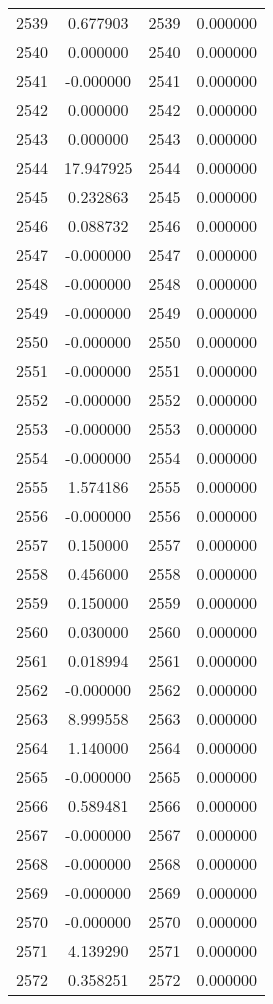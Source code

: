 \documentclass[12pt]{article}
\begin{document}
\begin{longtable}{@{}cccc@{}}
2539 & 0.677903 & 2539 & 0.000000 \\
2540 & 0.000000 & 2540 & 0.000000 \\
2541 & -0.000000 & 2541 & 0.000000 \\
2542 & 0.000000 & 2542 & 0.000000 \\
2543 & 0.000000 & 2543 & 0.000000 \\
2544 & 17.947925 & 2544 & 0.000000 \\
2545 & 0.232863 & 2545 & 0.000000 \\
2546 & 0.088732 & 2546 & 0.000000 \\
2547 & -0.000000 & 2547 & 0.000000 \\
2548 & -0.000000 & 2548 & 0.000000 \\
2549 & -0.000000 & 2549 & 0.000000 \\
2550 & -0.000000 & 2550 & 0.000000 \\
2551 & -0.000000 & 2551 & 0.000000 \\
2552 & -0.000000 & 2552 & 0.000000 \\
2553 & -0.000000 & 2553 & 0.000000 \\
2554 & -0.000000 & 2554 & 0.000000 \\
2555 & 1.574186 & 2555 & 0.000000 \\
2556 & -0.000000 & 2556 & 0.000000 \\
2557 & 0.150000 & 2557 & 0.000000 \\
2558 & 0.456000 & 2558 & 0.000000 \\
2559 & 0.150000 & 2559 & 0.000000 \\
2560 & 0.030000 & 2560 & 0.000000 \\
2561 & 0.018994 & 2561 & 0.000000 \\
2562 & -0.000000 & 2562 & 0.000000 \\
2563 & 8.999558 & 2563 & 0.000000 \\
2564 & 1.140000 & 2564 & 0.000000 \\
2565 & -0.000000 & 2565 & 0.000000 \\
2566 & 0.589481 & 2566 & 0.000000 \\
2567 & -0.000000 & 2567 & 0.000000 \\
2568 & -0.000000 & 2568 & 0.000000 \\
2569 & -0.000000 & 2569 & 0.000000 \\
2570 & -0.000000 & 2570 & 0.000000 \\
2571 & 4.139290 & 2571 & 0.000000 \\
2572 & 0.358251 & 2572 & 0.000000 \\

\end{longtable}
\end{document}
